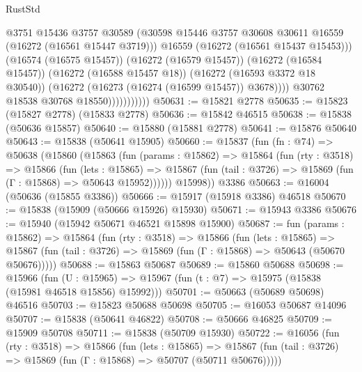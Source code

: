 \begin{lexlean}{RustStd}
\begin{coremodule}
                                @3751
                                @15436
                                @3757
                                @30589
                                (@30598
                                  @15446
                                  @3757
                                  @30608
                                  @30611
                                  @16559
                                  (@16272 (@16561 @15447 @3719)))
                                @16559
                                (@16272 (@16561 @15437 @15453)))
                              (@16574 (@16575 @15457))
                              (@16272 (@16579 @15457))
                              (@16272 (@16584 @15457))
                              (@16272 (@16588 @15457 @18))
                              (@16272 (@16593 @3372 @18 @30540))
                              (@16272 (@16273 (@16274 (@16599 @15457)) @3678))))
                          @30762
                          @18538
                          @30768
                          @18550)))))))))))
@50631 := @15821 @2778
@50635 := @15823 (@15827 @2778) (@15833 @2778)
@50636 := @15842 @46515
@50638 := @15838 (@50636 @15857)
@50640 := @15880 (@15881 @2778)
@50641 := @15876 @50640
@50643 := @15838 (@50641 @15905)
@50660 := @15837
    (fun (fn : @74) =>
    @50638
      (@15860
        (@15863
          (fun (params : @15862) =>
          @15864
            (fun (rty : @3518) =>
            @15866
              (fun (lets : @15865) =>
              @15867 (fun (tail : @3726) => @15869 (fun (Γ : @15868) => @50643 @15952))))))
        @15998))
    @3386
@50663 := @16004 (@50636 (@15855 @3386))
@50666 := @15917 (@15918 @3386) @46518
@50670 := @15838 (@15909 (@50666 @15926) @15930)
@50671 := @15943 @3386
@50676 := @15940 (@15942 @50671 @46521 @15898 @15900)
@50687 := fun (params : @15862) =>
  @15864
    (fun (rty : @3518) =>
    @15866
      (fun (lets : @15865) =>
      @15867 (fun (tail : @3726) => @15869 (fun (Γ : @15868) => @50643 (@50670 @50676)))))
@50688 := @15863 @50687
@50689 := @15860 @50688
@50698 := @15966
    (fun (U : @15965) => @15967 (fun (t : @7) => @15975 (@15838 (@15981 @46518 @15856) @15992)))
@50701 := @50663 (@50689 @50698) @46516
@50703 := @15823 @50688 @50698
@50705 := @16053 @50687 @14096
@50707 := @15838 (@50641 @46822)
@50708 := @50666 @46825
@50709 := @15909 @50708
@50711 := @15838 (@50709 @15930)
@50722 := @16056
    (fun (rty : @3518) =>
    @15866
      (fun (lets : @15865) =>
      @15867 (fun (tail : @3726) => @15869 (fun (Γ : @15868) => @50707 (@50711 @50676)))))

\end{coremodule}
\end{lexlean}
